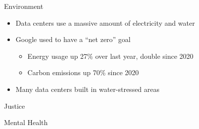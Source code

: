 \documentclass[xcolor={usenames,dvipsnames,svgnames,table},12pt]{beamer}
\begin{document}
\begin{frame}{Environment}
  \begin{itemize}
  \item Data centers use a massive amount of electricity and water
  \item Google used to have a ``net zero'' goal
    \begin{itemize}
    \item Energy usage up 27\% over last year, double since 2020
    \item Carbon emissions up 70\% since 2020
    \end{itemize}
  \item Many data centers built in water-stressed areas
  \end{itemize}
\end{frame}

\begin{frame}{Justice}
\end{frame}

\begin{frame}{Mental Health}
\end{frame}
\end{document}
